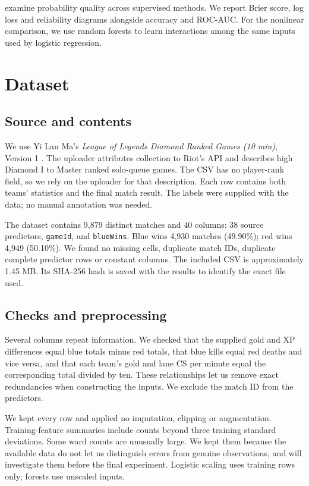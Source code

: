 \documentclass[11pt]{article}
\begin{document}
\citet{niculescu2005} examine probability quality across supervised methods. We report Brier score, log loss and reliability diagrams alongside accuracy and ROC-AUC. For the nonlinear comparison, we use random forests \citep{breiman2001} to learn interactions among the same inputs used by logistic regression.

\section{Dataset}

\subsection{Source and contents}

We use Yi Lan Ma's \emph{League of Legends Diamond Ranked Games (10 min)}, Version 1 \citep{ma2020}. The uploader attributes collection to Riot's API and describes high Diamond I to Master ranked solo-queue games. The CSV has no player-rank field, so we rely on the uploader for that description. Each row contains both teams' statistics and the final match result. The labels were supplied with the data; no manual annotation was needed.

The dataset contains 9,879 distinct matches and 40 columns: 38 source predictors, \texttt{gameId}, and \texttt{blueWins}. Blue wins 4,930 matches (49.90\%); red wins 4,949 (50.10\%). We found no missing cells, duplicate match IDs, duplicate complete predictor rows or constant columns. The included CSV is approximately 1.45 MB. Its SHA-256 hash is saved with the results to identify the exact file used.

\subsection{Checks and preprocessing}

Several columns repeat information. We checked that the supplied gold and XP differences equal blue totals minus red totals, that blue kills equal red deaths and vice versa, and that each team's gold and lane CS per minute equal the corresponding total divided by ten. These relationships let us remove exact redundancies when constructing the inputs. We exclude the match ID from the predictors.

We kept every row and applied no imputation, clipping or augmentation. Training-feature summaries include counts beyond three training standard deviations. Some ward counts are unusually large. We kept them because the available data do not let us distinguish errors from genuine observations, and will investigate them before the final experiment. Logistic scaling uses training rows only; forests use unscaled inputs.
\end{document}
